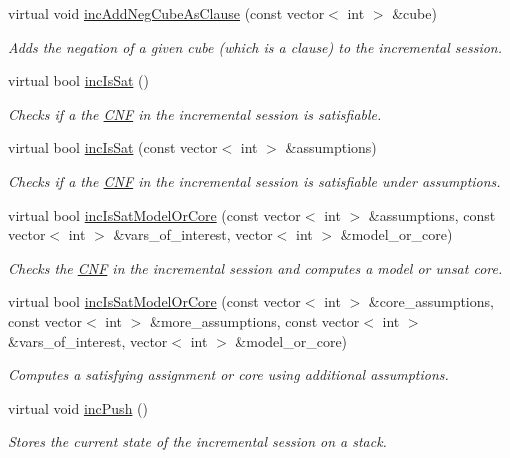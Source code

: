 \begin{DoxyCompactItemize}
virtual void \hyperlink{classLingelingApi_afefd24f97e49aed7cbaf25140a6b7741}{inc\-Add\-Neg\-Cube\-As\-Clause} (const vector$<$ int $>$ \&cube)
\begin{DoxyCompactList}\small\item\em Adds the negation of a given cube (which is a clause) to the incremental session. \end{DoxyCompactList}\item 
virtual bool \hyperlink{classLingelingApi_a7a96e3b1078e40305f8b5e329f0a1e26}{inc\-Is\-Sat} ()
\begin{DoxyCompactList}\small\item\em Checks if a the \hyperlink{classCNF}{C\-N\-F} in the incremental session is satisfiable. \end{DoxyCompactList}\item 
virtual bool \hyperlink{classLingelingApi_a192ddd0f1d27617570c759b3496ea90d}{inc\-Is\-Sat} (const vector$<$ int $>$ \&assumptions)
\begin{DoxyCompactList}\small\item\em Checks if a the \hyperlink{classCNF}{C\-N\-F} in the incremental session is satisfiable under assumptions. \end{DoxyCompactList}\item 
virtual bool \hyperlink{classLingelingApi_a5f70806ab80cb622f4f7286f66284c4e}{inc\-Is\-Sat\-Model\-Or\-Core} (const vector$<$ int $>$ \&assumptions, const vector$<$ int $>$ \&vars\-\_\-of\-\_\-interest, vector$<$ int $>$ \&model\-\_\-or\-\_\-core)
\begin{DoxyCompactList}\small\item\em Checks the \hyperlink{classCNF}{C\-N\-F} in the incremental session and computes a model or unsat core. \end{DoxyCompactList}\item 
virtual bool \hyperlink{classLingelingApi_a95680a60e64dccddbe007ef7d4c8a960}{inc\-Is\-Sat\-Model\-Or\-Core} (const vector$<$ int $>$ \&core\-\_\-assumptions, const vector$<$ int $>$ \&more\-\_\-assumptions, const vector$<$ int $>$ \&vars\-\_\-of\-\_\-interest, vector$<$ int $>$ \&model\-\_\-or\-\_\-core)
\begin{DoxyCompactList}\small\item\em Computes a satisfying assignment or core using additional assumptions. \end{DoxyCompactList}\item 
virtual void \hyperlink{classLingelingApi_a91c858d2a36a4fbe580909a793802a76}{inc\-Push} ()
\begin{DoxyCompactList}\small\item\em Stores the current state of the incremental session on a stack. \end{DoxyCompactList}\item 

\end{DoxyCompactItemize}
